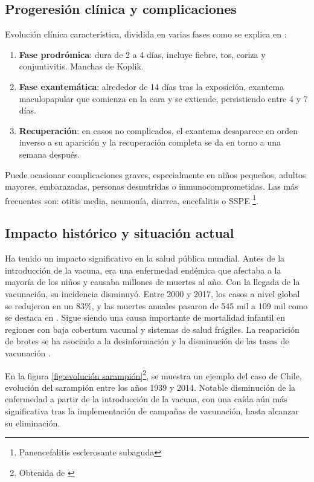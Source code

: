 \begin{enumerate}
\subsection{Progeresión clínica y complicaciones}
Evolución clínica característica, dividida en varias fases como se explica en \cite{cdc_measles}:
\begin{enumerate}
    \item \textbf{Fase prodrómica}: dura de 2 a 4 días, incluye fiebre, tos, coriza y conjuntivitis. Manchas de Koplik.
    \item \textbf{Fase exantemática}: alrededor de 14 días tras la exposición, exantema maculopapular que comienza en la cara y se extiende, persistiendo entre 4 y 7 días.
    \item \textbf{Recuperación}: en casos no complicados, el exantema desaparece en orden inverso a su aparición y la recuperación completa se da en torno a una semana después.
\end{enumerate}

Puede ocasionar complicaciones graves, especialmente en niños pequeños, adultos mayores, embarazadas, personas desnutridas o inmunocomprometidas. Las más frecuentes son: otitis media, neumonía, diarrea, encefalitis o SSPE \footnote{Panencefalitis esclerosante subaguda}.

\subsection{Impacto histórico y situación actual}
Ha tenido un impacto significativo en la salud pública mundial. Antes de la introducción de la vacuna, era una enfermedad endémica que afectaba a la mayoría de los niños y causaba millones de muertes al año. Con la llegada de la vacunación, su incidencia disminuyó. Entre 2000 y 2017, los casos a nivel global se redujeron en un 83\%, y las muertes anuales pasaron de 545 mil a 109 mil como se destaca en \cite{shanks2014measles}. 
Sigue siendo una causa importante de mortalidad infantil en regiones con baja cobertura vacunal y sistemas de salud frágiles. La reaparición de brotes se ha asociado a la desinformación y la disminución de las tasas de vacunación \cite{fischer2016zinc}.

En la figura \ref{fig:evolución sarampión}\footnote{Obtenida de \cite{ahumada2015modelos}}, se muestra un ejemplo del caso de Chile, evolución del sarampión entre los años 1939 y 2014. Notable disminución de la enfermedad a partir de la introducción de la vacuna, con una caída aún más significativa tras la implementación de campañas de vacunación, hasta alcanzar su eliminación.


\end{enumerate}
